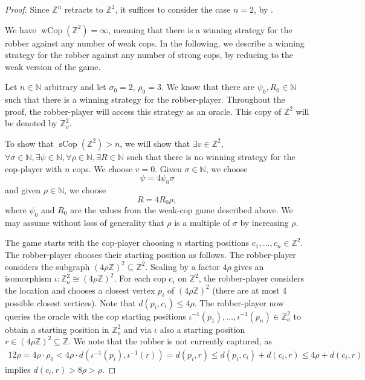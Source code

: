 \documentclass{amsart}
\theoremstyle{definition}
\theoremstyle{remark}
\theoremstyle{remark}
\theoremstyle{definition}
\newcommand{\sCop}{\operatorname{sCop}}
\newcommand{\wCop}{\operatorname{wCop}}
\newcommand{\rhoZ}{(4\rho\mathbb{Z})^2}
\newcommand{\Zo}{\mathbb{Z}_o^2}
\newcommand{\Z}{\mathbb{Z}} %
\renewcommand{\leq}{\leqslant}
\begin{document}
\begin{proof}
    Since $\mathbb{Z}^n$ retracts to $\mathbb{Z}^2$, it suffices to consider the case $n=2$, by .

    We have $\wCop(\mathbb{Z}^2)=\infty$, meaning that there is a winning strategy for the robber against any number of weak cops. In the following, we describe a winning strategy for the robber against any number of strong cops, by reducing to the weak version of the game.

    Let $n\in \mathbb{N}$ arbitrary and let $\sigma_0=2$, $\rho_0=3$. We know that there are $\psi_0, R_0 \in \mathbb{N}$ such that there is a winning strategy for the robber-player. Throughout the proof, the robber-player will access this strategy as an oracle. This copy of $\mathbb{Z}^2$ will be denoted by $\Zo$.

 To show that $\sCop(\mathbb{Z}^2) > n$, we will show that $\exists v \in \mathbb{Z}^2$, $\forall \sigma \in \mathbb{N}, \exists \psi \in \mathbb{N}, \forall \rho \in \mathbb{N}, \exists R \in \mathbb{N}$ such that there is no winning strategy for the cop-player with $n$ cops. We choose $v=0$. Given $\sigma \in \mathbb{N}$, we choose
 $$
 \psi = 4\psi_0 \sigma
 $$
 and given $\rho\in \mathbb{N}$, we choose
 $$
 R = 4 R_0 \rho,
 $$
 where $\psi_0$ and $R_0$ are the values from the weak-cop game described above. We may assume without loss of generality that $\rho$ is a multiple of $\sigma$ by increasing $\rho$.

 The game starts with the cop-player choosing $n$ starting positions $c_1, \ldots, c_n \in \mathbb{Z}^2$. The robber-player chooses their starting position as follows. The robber-player considers the subgraph $\rhoZ \subseteq \mathbb{Z}^2$. Scaling by a factor $4\rho$ gives an isomorphism $\iota \colon \Zo \cong \rhoZ$. For each cop $c_i$ on $\mathbb{Z}^2$, the robber-player considers the location and chooses a closest vertex $p_i$ of $\rhoZ$ (there are at most 4 possible closest vertices). Note that $d(p_i,c_i) \leq 4\rho$. The robber-player now queries the oracle with the cop starting positions $\iota^{-1}(p_1), \ldots, \iota^{-1}(p_n) \in \Zo$ to obtain a starting position in $\Zo$ and via $\iota$ also a starting position $r \in \rhoZ \subseteq \Z$. We note that the robber is not currently captured, as
 \begin{align*}
    12\rho = 4 \rho \cdot \rho_0 < 4\rho \cdot d(\iota^{-1}(p_i),\iota^{-1}(r)) = d(p_i, r) \leq d(p_i,c_i) + d(c_i,r) \leq 4\rho + d(c_i,r)
 \end{align*}
 implies $d(c_i,r) > 8\rho > \rho$.


\end{proof}
\end{document}
